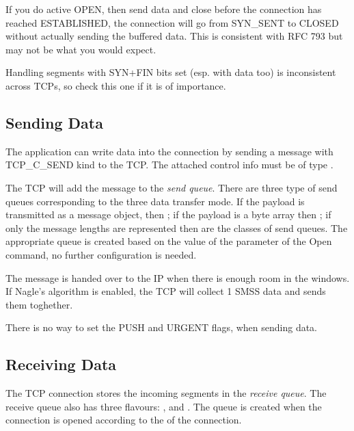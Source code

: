 \begin{note}
If you do active OPEN, then send data and close before the connection
has reached ESTABLISHED, the connection will go from SYN\_SENT to CLOSED
without actually sending the buffered data. This is consistent with
RFC 793 but may not be what you would expect.
\end{note}

\begin{note}
Handling segments with SYN+FIN bits set (esp. with data too) is
inconsistent across TCPs, so check this one if it is of importance.
\end{note}

\subsection{Sending Data}

The application can write data into the connection
by sending a message with TCP\_C\_SEND kind to the TCP.
The attached control info must be of type .

The TCP will add the message to the \emph{send queue}.
There are three type of send queues corresponding to the
three data transfer mode. If the payload is transmitted as a message
object, then ;
if the payload is a byte array then ;
if only the message lengths are represented then 
are the classes of send queues. The appropriate queue is created based
on the value of the  parameter of the Open command, no
further configuration is needed.

The message is handed over to the IP when there is
enough room in the windows. If Nagle's algorithm is
enabled, the TCP will collect 1 SMSS data and sends
them toghether.

\begin{note}
There is no way to set the PUSH and URGENT flags, when sending data.
\end{note}


\subsection{Receiving Data}

The TCP connection stores the incoming segments in the
\emph{receive queue}. The receive queue also has three flavours:
, 
and . The queue is created
when the connection is opened according to the 
of the connection.

